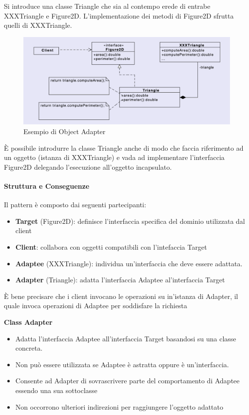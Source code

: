 Si introduce una classe Triangle che sia al contempo erede di entrabe XXXTriangle e Figure2D. L'implementazione dei metodi di Figure2D sfrutta quelli di XXXTriangle.

\begin{figure}[H]
    \centering
    \includegraphics[width=0.75\linewidth]{assets/pattern/adapter/object-adapter.png}
    \caption{Esempio di Object Adapter}
\end{figure}

È possibile introdurre la classe Triangle anche di modo che faccia riferimento ad un oggetto (istanza di XXXTriangle) e vada ad implementare l'interfaccia Figure2D delegando l'esecuzione all'oggetto incapsulato.

\paragraph{Struttura e Conseguenze} Il pattern è composto dai seguenti partecipanti:
\begin{itemize}
    \item \textbf{Target} (Figure2D): definisce l'interfaccia specifica del dominio utilizzata dal client
    \item \textbf{Client}: collabora con oggetti compatibili con l'intefaccia Target
    \item \textbf{Adaptee} (XXXTriangle): individua un'interfaccia che deve essere adattata.
    \item \textbf{Adapter} (Triangle): adatta l'interfaccia Adaptee al'interfaccia Target
\end{itemize}

È bene precisare che i client invocano le operazioni su in'istanza di Adapter, il quale invoca operazioni di Adaptee per soddisfare la richiesta

\textbf{Class Adapter}
\begin{itemize}
    \item Adatta l'interfaccia Adaptee all'interfaccia Target basandosi su una classe concreta.
    \item Non può essere utilizzata se Adaptee è astratta oppure è un'interfaccia.
    \item Consente ad Adapter di sovrascrivere parte del comportamento di Adaptee essendo una sua sottoclasse
    \item Non occorrono ulteriori indirezioni per raggiungere l'oggetto adattato
\end{itemize}

